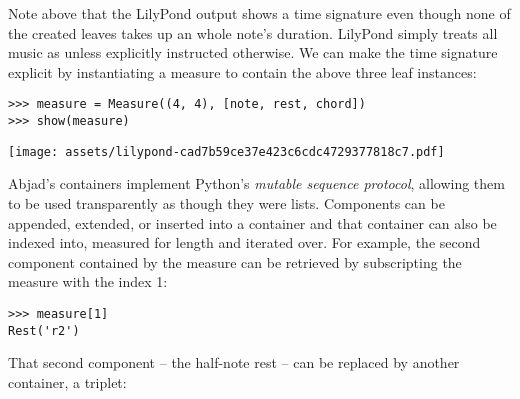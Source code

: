 \noindent Note above that the LilyPond output shows a  time
signature even though none of the created leaves takes up an whole note's
duration. LilyPond simply treats all music as  unless explicitly
instructed otherwise. We can make the  time signature explicit by
instantiating a  measure to contain the above three leaf instances:

\begin{comment}
<abjad>
measure = Measure((4, 4), [note, rest, chord])
show(measure)
</abjad>
\end{comment}

\begin{abjadbookoutput}
\begin{singlespacing}
\vspace{-0.5\baselineskip}
\begin{lstlisting}
>>> measure = Measure((4, 4), [note, rest, chord])
>>> show(measure)
\end{lstlisting}
\noindent\texttt{[image: assets/lilypond-cad7b59ce37e423c6cdc4729377818c7.pdf]}
\end{singlespacing}
\end{abjadbookoutput}

Abjad's containers implement Python's \emph{mutable sequence protocol},
allowing them to be used transparently as though they were lists. Components
can be appended, extended, or inserted into a container and that container can
also be indexed into, measured for length and iterated over. For example, the
second component contained by the measure can be retrieved by subscripting the
measure with the index 1:

\begin{comment}
<abjad>
measure[1]
</abjad>
\end{comment}

\begin{abjadbookoutput}
\begin{singlespacing}
\vspace{-0.5\baselineskip}
\begin{lstlisting}
>>> measure[1]
Rest('r2')
\end{lstlisting}
\end{singlespacing}
\end{abjadbookoutput}

That second component -- the half-note rest -- can be replaced by
another container, a triplet:

\begin{comment}
<abjad>
outer_tuplet = Tuplet((2, 3), "a'4 b4 cs'4")
measure[1] = outer_tuplet
show(measure)
</abjad>
\end{comment}


